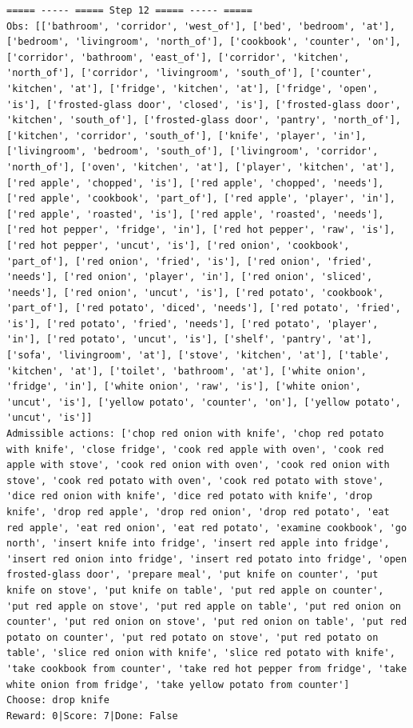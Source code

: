 \documentclass[11pt]{article}
\begin{document}
\begin{lstlisting}
===== ----- ===== Step 12 ===== ----- =====
Obs: [['bathroom', 'corridor', 'west_of'], ['bed', 'bedroom', 'at'], ['bedroom', 'livingroom', 'north_of'], ['cookbook', 'counter', 'on'], ['corridor', 'bathroom', 'east_of'], ['corridor', 'kitchen', 'north_of'], ['corridor', 'livingroom', 'south_of'], ['counter', 'kitchen', 'at'], ['fridge', 'kitchen', 'at'], ['fridge', 'open', 'is'], ['frosted-glass door', 'closed', 'is'], ['frosted-glass door', 'kitchen', 'south_of'], ['frosted-glass door', 'pantry', 'north_of'], ['kitchen', 'corridor', 'south_of'], ['knife', 'player', 'in'], ['livingroom', 'bedroom', 'south_of'], ['livingroom', 'corridor', 'north_of'], ['oven', 'kitchen', 'at'], ['player', 'kitchen', 'at'], ['red apple', 'chopped', 'is'], ['red apple', 'chopped', 'needs'], ['red apple', 'cookbook', 'part_of'], ['red apple', 'player', 'in'], ['red apple', 'roasted', 'is'], ['red apple', 'roasted', 'needs'], ['red hot pepper', 'fridge', 'in'], ['red hot pepper', 'raw', 'is'], ['red hot pepper', 'uncut', 'is'], ['red onion', 'cookbook', 'part_of'], ['red onion', 'fried', 'is'], ['red onion', 'fried', 'needs'], ['red onion', 'player', 'in'], ['red onion', 'sliced', 'needs'], ['red onion', 'uncut', 'is'], ['red potato', 'cookbook', 'part_of'], ['red potato', 'diced', 'needs'], ['red potato', 'fried', 'is'], ['red potato', 'fried', 'needs'], ['red potato', 'player', 'in'], ['red potato', 'uncut', 'is'], ['shelf', 'pantry', 'at'], ['sofa', 'livingroom', 'at'], ['stove', 'kitchen', 'at'], ['table', 'kitchen', 'at'], ['toilet', 'bathroom', 'at'], ['white onion', 'fridge', 'in'], ['white onion', 'raw', 'is'], ['white onion', 'uncut', 'is'], ['yellow potato', 'counter', 'on'], ['yellow potato', 'uncut', 'is']]
Admissible actions: ['chop red onion with knife', 'chop red potato with knife', 'close fridge', 'cook red apple with oven', 'cook red apple with stove', 'cook red onion with oven', 'cook red onion with stove', 'cook red potato with oven', 'cook red potato with stove', 'dice red onion with knife', 'dice red potato with knife', 'drop knife', 'drop red apple', 'drop red onion', 'drop red potato', 'eat red apple', 'eat red onion', 'eat red potato', 'examine cookbook', 'go north', 'insert knife into fridge', 'insert red apple into fridge', 'insert red onion into fridge', 'insert red potato into fridge', 'open frosted-glass door', 'prepare meal', 'put knife on counter', 'put knife on stove', 'put knife on table', 'put red apple on counter', 'put red apple on stove', 'put red apple on table', 'put red onion on counter', 'put red onion on stove', 'put red onion on table', 'put red potato on counter', 'put red potato on stove', 'put red potato on table', 'slice red onion with knife', 'slice red potato with knife', 'take cookbook from counter', 'take red hot pepper from fridge', 'take white onion from fridge', 'take yellow potato from counter']
Choose: drop knife
Reward: 0|Score: 7|Done: False


\end{lstlisting}
\end{document}
